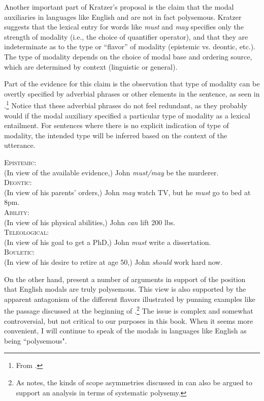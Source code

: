 Another important part of Kratzer’s proposal is the claim that the modal auxiliaries in languages like English and  are not in fact polysemous. Kratzer suggests that the lexical entry for words like \textit{must} and \textit{may} specifies only the strength of modality (i.e., the choice of quantifier operator), and that they are indeterminate as to the type or “flavor” of modality (epistemic vs. deontic, etc.). The type of modality depends on the choice of modal base and ordering source, which are determined by context (linguistic or general).



Part of the evidence for this claim is the observation that type of modality can be overtly specified by adverbial phrases or other elements in the sentence, as seen in .\footnote{From \citet{Hacquard2011}.} Notice that these adverbial phrases do not feel redundant, as they probably would if the modal auxiliary specified a particular type of modality as a lexical entailment. For sentences where there is no explicit indication of type of modality, the intended type will be inferred based on the context of the utterance.


\ea \label{ex:16.24}
\ea  \textsc{Epistemic:}\\
(In view of the available evidence,) John \textit{must/may} be the murderer.\\
\ex \textsc{Deontic:}\\
(In view of his parents’ orders,) John \textit{may} watch TV, but he \textit{must} go to bed at 8pm.\\
\ex \textsc{Ability:}\\
(In view of his physical abilities,) John \textit{can} lift 200 lbs.\\
\ex \textsc{Teleological:}\\
(In view of his goal to get a PhD,) John \textit{must} write a dissertation.\\
\ex \textsc{Bouletic:}\\
(In view of his desire to retire at age 50,) John \textit{should} work hard now.
                       \z
\z


On the other hand, \citet{Viebahn&Vetter2016} present a number of arguments in support of the position that English modals are truly polysemous. This view is also supported by the apparent antagonism of the different flavors illustrated by punning examples like the passage discussed at the beginning of .\footnote{As \citet{Hacquard2011} notes, the kinds of scope asymmetries discussed in  can also be argued to support an analysis in terms of systematic polysemy.} The issue is complex and somewhat controversial, but not critical to our purposes in this book. When it seems more convenient, I will continue to speak of the modals in languages like English as being ``polysemous".


